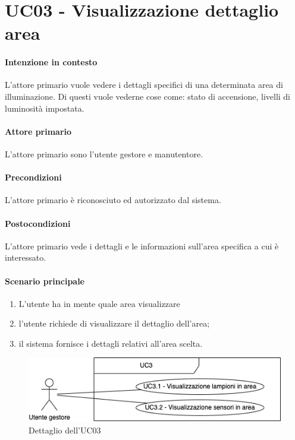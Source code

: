 \section{UC03 - Visualizzazione dettaglio area}\label{uc:03}
\paragraph{Intenzione in contesto} L'attore primario vuole vedere i dettagli specifici di una determinata area di illuminazione. Di questi vuole vederne cose come: stato di accensione, livelli di luminosità impostata.

\paragraph{Attore primario} L'attore primario sono l'utente gestore e manutentore.

\paragraph{Precondizioni} L'attore primario è riconosciuto ed autorizzato dal sistema.

\paragraph{Postocondizioni} L'attore primario vede i dettagli e le informazioni sull'area specifica a cui è interessato.

\paragraph{Scenario principale}

\begin{enumerate}
    \item L'utente ha in mente quale area visualizzare
    \item l'utente richiede di visualizzare il dettaglio dell'area;
    \item il sistema fornisce i dettagli relativi all'area scelta.
\end{enumerate}

\begin{figure}[h]
    \includegraphics[width=\textwidth]{contenuti/img/casi_uso_grafici-uc3.png}
    \caption{Dettaglio dell'UC03}
    \label{fig:uc03}
\end{figure}

